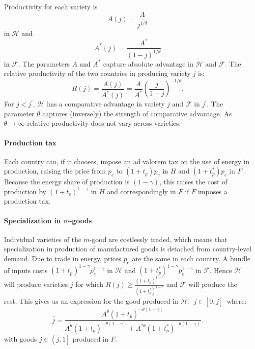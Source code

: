 \documentclass[notitlepage,12pt]{article}
\begin{document}
Productivity for each variety is%
\begin{equation*}
A(j)=\frac{A}{j^{1/\theta }}
\end{equation*}%
in $\mathcal{H}$ and%
\begin{equation*}
A^{\ast }(j)=\frac{A^{\ast }}{\left( 1-j\right) ^{1/\theta }}
\end{equation*}%
in $\mathcal{F}$. The parameters $A$ and $A^{\ast }$ capture absolute
advantage in $\mathcal{H}$ and $\mathcal{F}$. The relative productivity of
the two countries in producing variety $j$ is:%
\begin{equation}
R(j)=\frac{A(j)}{A^{\ast }(j)}=\frac{A}{A^{\ast }}\left( \frac{j}{1-j}%
\right) ^{-1/\theta }.  \label{relative productivity}
\end{equation}%
For $j<j^{\prime }$, $\mathcal{H}$ has a comparative advantage in variety $j$
and $\mathcal{F}$ in $j^{\prime }$. The parameter $\theta $ captures
(inversely) the strength of comparative advantage. As $\theta \rightarrow
\infty $ relative productivity does not vary across varieties.

\paragraph{Production tax}

Each country can, if it chooses, impose an ad valorem tax on the use of
energy in production, raising the price from $p_{e}$ to $\left(
1+t_{p}\right) p_{e}$ in $H$ and $\left( 1+t_{p}^{\ast }\right) p_{e}$ in $F$%
. Because the energy share of production is $\left( 1-\gamma \right) $, this
raises the cost of production by $\left( 1+t_{e}\right) ^{1-\gamma }$ in $H$
and correspondingly in $F$ if $F$ imposes a production tax.

\paragraph{Specialization in $m$-goods}

Individual varieties of the $m$-good are costlessly traded, which means that
specialization in production of manufactured goods is detached from
country-level demand. Due to trade in energy, prices $p_{e}$ are the same in
each country. A bundle of inputs costs $\left( 1+t_{p}\right) ^{1-\gamma
}p_{e}^{1-\gamma }$ in $\mathcal{H}$ and $\left( 1+t_{p}^{\ast }\right)
^{1-\gamma }p_{e}^{1-\gamma }$ in $\mathcal{F}$. Hence $\mathcal{H}$ will
produce varieties $j$ for which $R(j)\geq \frac{\left( 1+t_{p}\right)
^{1-\gamma }}{\left( 1+t_{p}^{\ast }\right) ^{1-\gamma }}$ and $\mathcal{F}$
will produce the rest. This gives us an expression for the good produced in $%
\mathcal{H}$: $\ j\in \left[ 0,\bar{j}\right] $\ where:%
\begin{equation}
\bar{j}=\frac{A^{\theta }\left( 1+t_{p}\right) ^{-\theta \left( 1-\gamma
\right) }}{A^{\theta }\left( 1+t_{p}\right) ^{-\theta \left( 1-\gamma
\right) }+A^{\ast \theta }\left( 1+t_{p}^{\ast }\right) ^{-\theta \left(
1-\gamma \right) }}.  \label{jbar}
\end{equation}%
with goods $j\in \left( \bar{j},1\right] $ produced in $F$.
\end{document}
